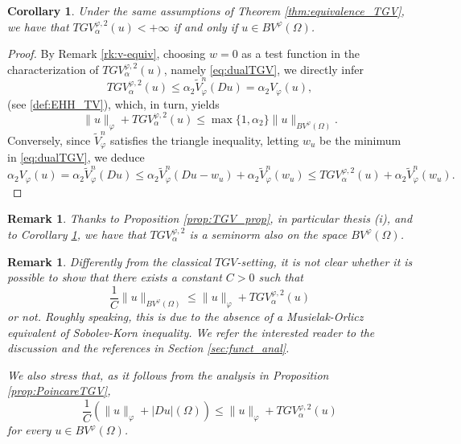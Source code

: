 \documentclass[a4paper,11pt,oneside,notitlepage]{article}
\newtheorem{corollary}[theorem]{Corollary}
\newtheorem{remark}[theorem]{Remark}
\numberwithin{equation}{section}
\newcommand{\vphi}{\varphi}
\begin{document}
\begin{corollary}
\label{cor:quasi_equiv}
    Under the same assumptions of Theorem \ref{thm:equivalence_TGV}, we have that $TGV^{\vphi,2}_\alpha(u) < +\infty$ if and only if $u\in BV^\vphi(\Omega)$.
\end{corollary}
\begin{proof}
    By Remark \ref{rk:v-equiv}, choosing $w = 0$ as a test function in the characterization of $TGV^{\vphi,2}_\alpha(u)$, namely \eqref{eq:dualTGV}, we directly infer
    \begin{equation*}
        TGV^{\vphi,2}_\alpha(u) \le \alpha_2 \widetilde{V}_\vphi^n(Du) = \alpha_2 V_\vphi(u),
    \end{equation*}
    (see \eqref{def:EHH_TV}), 
    which, in turn, yields
    \begin{equation*}
        \|u\|_\vphi + TGV^{\vphi,2}_\alpha(u) \le \max\{1,\alpha_2 \} \|u\|_{BV^\vphi(\Omega)}.
    \end{equation*}
    Conversely, since $\widetilde{V}^n_\vphi$ satisfies the triangle inequality, letting $w_u$ be the minimum in \eqref{eq:dualTGV}, we deduce
    \begin{equation*}
        \alpha_2 V_{\vphi}(u) = \alpha_2 \widetilde{V}_\vphi^n(Du) \le \alpha_2 \widetilde{V}_\vphi^n(Du - w_u) + \alpha_2 \widetilde{V}_\vphi^n(w_u) \le TGV^{\vphi,2}_\alpha(u) + \alpha_2 \widetilde{V}_\vphi^n(w_u).
    \end{equation*}
\end{proof}

\begin{remark}\label{rem as thm 3.3}
    Thanks to Proposition \ref{prop:TGV_prop}, in particular thesis (i), and to Corollary \ref{cor:quasi_equiv}, we have that $TGV^{\vphi,2}_\alpha$ is a seminorm also on the space $BV^\vphi(\Omega)$.
\end{remark}

\begin{remark}
    Differently from the classical $TGV$-setting, it is not clear whether it is possible to show that there exists a constant $C > 0$ such that 
    \begin{equation*}
        \frac{1}{C} \|u\|_{BV^\vphi(\Omega)} \le \|u\|_\vphi + TGV^{\vphi,2}_\alpha(u)
    \end{equation*}
    or not. Roughly speaking, this is due to the absence of a Musielak-Orlicz equivalent of Sobolev-Korn inequality. We refer the interested reader to the discussion and the references in Section \ref{sec:funct_anal}.

    
   We also stress that, as it follows from the analysis in Proposition \ref{prop:PoincareTGV},
    $$\frac{1}{C} (\|u\|_{\vphi}+ |Du|(\Omega))\leq  \|u\|_{\vphi}+ TGV^{\vphi,2}_\alpha(u)
    $$
    for every $u \in BV^\vphi(\Omega)$.
    
    
    
\end{remark}
\end{document}
